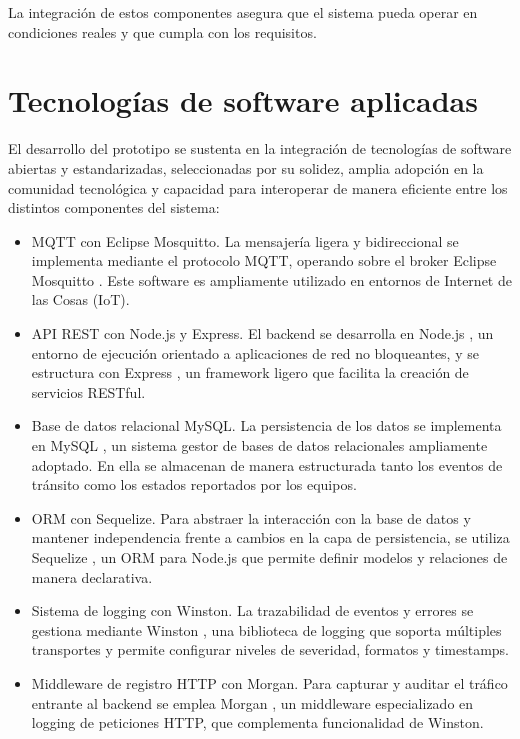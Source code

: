 La integración de estos componentes asegura que el sistema pueda operar en condiciones reales y que cumpla con los requisitos.


\section{Tecnologías de software aplicadas}
El desarrollo del prototipo se sustenta en la integración de tecnologías de software abiertas y estandarizadas, seleccionadas por su solidez, amplia adopción en la comunidad tecnológica y capacidad para interoperar de manera eficiente entre los distintos componentes del sistema:

\begin{itemize}

\item MQTT con Eclipse Mosquitto. 
La mensajería ligera y bidireccional se implementa mediante el protocolo MQTT, operando sobre el broker Eclipse Mosquitto \cite{mosquitto}. Este software es ampliamente utilizado en entornos de Internet de las Cosas (IoT).

\item API REST con Node.js  y Express. 
El backend se desarrolla en Node.js \cite{nodejs}, un entorno de ejecución orientado a aplicaciones de red no bloqueantes, y se estructura con Express \cite{expressjs}, un framework ligero que facilita la creación de servicios RESTful.

\item Base de datos relacional MySQL. 
La persistencia de los datos se implementa en MySQL \cite{mysql}, un sistema gestor de bases de datos relacionales ampliamente adoptado. En ella se almacenan de manera estructurada tanto los eventos de tránsito como los estados reportados por los equipos.

\item ORM con Sequelize.
Para abstraer la interacción con la base de datos y mantener independencia frente a cambios en la capa de persistencia, se utiliza Sequelize \cite{sequelize}, un ORM para Node.js que permite definir modelos y relaciones de manera declarativa.  

\item Sistema de logging con Winston.
La trazabilidad de eventos y errores se gestiona mediante Winston \cite{winston}, una biblioteca de logging que soporta múltiples transportes y permite configurar niveles de severidad, formatos y timestamps.  

\item Middleware de registro HTTP con Morgan.
Para capturar y auditar el tráfico entrante al backend se emplea Morgan \cite{morgan}, un middleware especializado en logging de peticiones HTTP, que complementa funcionalidad de Winston.  


\end{itemize}
